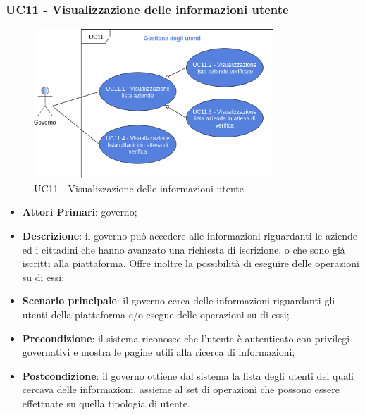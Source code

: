 \subsubsection{UC11 - Visualizzazione delle informazioni utente}
 \begin{figure}[h]
 	\includegraphics[width=9cm]{res/images/UC11.png}
 	\centering
 	\caption{UC11 - Visualizzazione delle informazioni utente}
 	
 \end{figure}
 \begin{itemize}
 	\item \textbf{Attori Primari}: governo;
 	\item \textbf{Descrizione}: il governo può accedere alle informazioni riguardanti le aziende ed i cittadini che hanno avanzato una richiesta di iscrizione, o che sono già iscritti alla piattaforma. Offre inoltre la possibilità di eseguire delle operazioni su di essi;
 	\item \textbf{Scenario principale}: il governo cerca delle informazioni riguardanti gli utenti della piattaforma e/o esegue delle operazioni su di essi;
 	
 	\item \textbf{Precondizione}: il sistema riconosce che l'utente è autenticato con privilegi governativi e mostra le pagine utili alla ricerca di informazioni;
 	
 	\item \textbf{Postcondizione}: il governo ottiene dal sistema la lista degli utenti dei quali cercava delle informazioni, assieme al set di operazioni che possono essere effettuate su quella tipologia di utente.
 \end{itemize}
